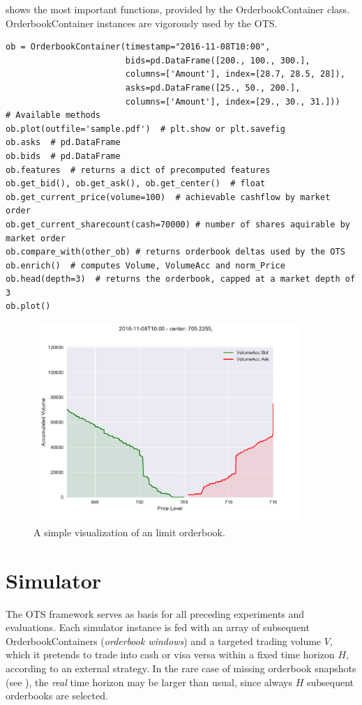  shows the most important functions, provided by the OrderbookContainer class. OrderbookContainer instances are vigorously used by the \ac{OTS}.

\begin{lstlisting}[frame=single, breaklines=true, basicstyle=\scriptsize, caption=OrderbookContainer, label=lst:OrderbookContainer]
ob = OrderbookContainer(timestamp="2016-11-08T10:00",
                        bids=pd.DataFrame([200., 100., 300.],
                        columns=['Amount'], index=[28.7, 28.5, 28]),
                        asks=pd.DataFrame([25., 50., 200.],
                        columns=['Amount'], index=[29., 30., 31.]))
# Available methods
ob.plot(outfile='sample.pdf')  # plt.show or plt.savefig
ob.asks  # pd.DataFrame
ob.bids  # pd.DataFrame
ob.features  # returns a dict of precomputed features
ob.get_bid(), ob.get_ask(), ob.get_center()  # float
ob.get_current_price(volume=100)  # achievable cashflow by market order
ob.get_current_sharecount(cash=70000) # number of shares aquirable by market order
ob.compare_with(other_ob) # returns orderbook deltas used by the OTS
ob.enrich()  # computes Volume, VolumeAcc and norm_Price
ob.head(depth=3)  # returns the orderbook, capped at a market depth of 3
ob.plot()
\end{lstlisting}


\begin{figure}[ht]
	\centering
   \includegraphics[width=0.9\textwidth]{content/drawings/orderbook}
	\caption{A simple visualization of an limit orderbook.}
	\label{fig:orderbook}
\end{figure}


\section{Simulator}
The \ac{OTS} framework serves as basis for all preceding experiments and evaluations.
Each simulator instance is fed with an array of subsequent OrderbookContainers (\emph{orderbook windows}) and a targeted trading volume $V$, which it pretends to trade into cash or visa versa within a fixed time horizon $H$, according to an external strategy. In the rare case of missing orderbook snapshots (see ), the \emph{real} time horizon may be larger than usual, since always $H$ subsequent orderbooks are selected.\\

